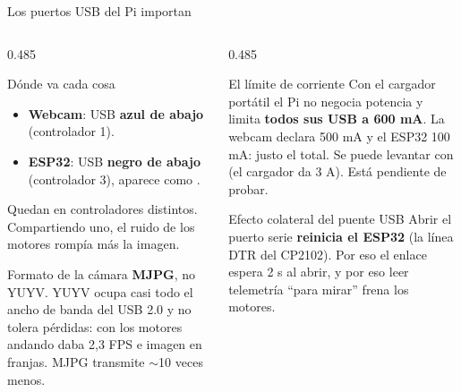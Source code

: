 \begin{frame}{Los puertos USB del Pi importan}
  \begin{columns}[T,onlytextwidth]
    \begin{column}{0.485\textwidth}
      \begin{block}{Dónde va cada cosa}
        \begin{itemize}
          \item \textbf{Webcam}: USB \textbf{azul de abajo} (controlador 1).
          \item \textbf{ESP32}: USB \textbf{negro de abajo} (controlador 3),
                aparece como .
        \end{itemize}
        Quedan en controladores distintos. Compartiendo uno, el ruido de los
        motores rompía más la imagen.
      \end{block}
      \begin{block}{Formato de la cámara}
        \textbf{MJPG}, no YUYV. YUYV ocupa casi todo el ancho de banda del USB
        2.0 y no tolera pérdidas: con los motores andando daba 2,3 FPS e
        imagen en franjas. MJPG transmite $\sim$10 veces menos.
      \end{block}
    \end{column}
    \begin{column}{0.485\textwidth}
      \begin{alertblock}{El límite de corriente}
        Con el cargador portátil el Pi no negocia potencia y limita \textbf{todos
        sus USB a 600 mA}. La webcam declara 500 mA y el ESP32 100 mA: justo
        el total. Se puede levantar con 
        (el cargador da 3 A). Está pendiente de probar.
      \end{alertblock}
      \begin{block}{Efecto colateral del puente USB}
        Abrir el puerto serie \textbf{reinicia el ESP32} (la línea DTR del
        CP2102). Por eso el enlace espera 2 s al abrir, y por eso leer
        telemetría ``para mirar'' frena los motores.
      \end{block}
    \end{column}
  \end{columns}
\end{frame}

